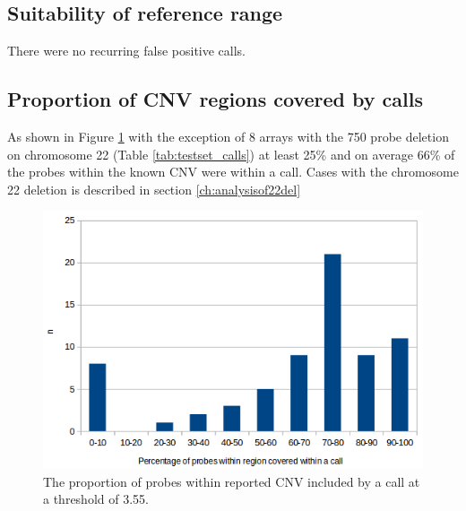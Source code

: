 \subsection{Suitability of reference range}
There were no recurring false positive calls.

\subsection{Proportion of CNV regions covered by calls}
As shown in Figure \ref{fig:testcasestrueposcoverage} with the exception of 8 arrays with the 750 probe deletion on chromosome 22 (Table \ref{tab:testset_calls}) at least 25\% and on average 66\% of the probes within the known CNV were within a call. Cases with the chromosome 22 deletion is described in section \ref{ch:analysisof22del}

\begin{figure}[h]
\centering
\includegraphics[width=1\linewidth]{./Figures/testcasestrueposcoverage}
\caption[Test cases: the proportion of probes within reported CNV included by a call at a threshold of 3.55]{The proportion of probes within reported CNV included by a call at a threshold of 3.55.}
\label{fig:testcasestrueposcoverage}
\end{figure}